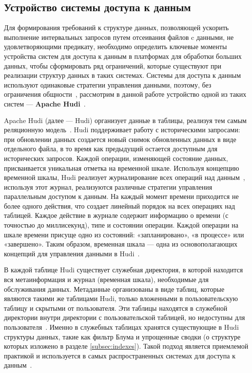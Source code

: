\subsection{Устройство системы доступа к данным}\label{subsec:systems_for_data_access}

Для формирования требований к структуре данных, позволяющей ускорить выполнение интервальных запросов путем отсеивания файлов c данными, не удовлетворяющими предикату, необходимо определить ключевые моменты устройства систем для доступа к данным в платформах для обработки больших данных, чтобы сформировать ряд ограничений, которые существуют при реализации структур данных в таких системах. Системы для доступа к данным используют одинаковые стратегии управления данными, поэтому, без ограничения общности~\cite{Analyzing_and_comparing_lakehouse_storage_systems}, рассмотрим в данной работе устройство одной из таких систем --- \textbf{Apache Hudi}~\cite{Analyzing_and_comparing_lakehouse_storage_systems}.

Apache Hudi (далее --- Hudi) организует данные в таблицы, реализуя тем самым реляционную модель~\cite{Database_systems_Garcia_Molina}. Hudi поддерживает работу с историческими запросами: при обновлении данных создается новый снимок обновленных данных в виде отдельного файла, в то время как предыдущий остается доступным для исторических запросов. Каждой операции, изменяющей состояние данных, присваивается уникальная отметка на временной шкале. Используя концепцию временной шкалы, Hudi реализует журналирование всех операций над данным~\cite{A_Logic_of_File_Systems}, используя этот журнал, реализуются различные стратегии управления параллельным доступом к данным. На каждый момент времени приходится не более одного действия, что создает линейный порядок на всех операциях над таблицей. Каждое действие в журнале содержит информацию о времени (с точностью до миллисекунд), типе и состоянии операции. Каждой операции на шкале времени присуще одно из состояний: «запланировано», «в процессе» или «завершено». Таким образом, временная шкала --- одна из основополагающих концепций для управления данными в Hudi~\cite{Hudi_Timeline}.

В каждой таблице Hudi существует служебная директория, в которой находится вся метаинформация и журнал (временная шкала), необходимые для обслуживания данных. Метаданные организованы в виде таблиц, которые  являются такими же таблицами Hudi, только вложенными в пользовательскую таблицу и скрытыми от пользователя. Эти таблицы находятся в служебной директории внутри директории с пользовательской таблицей, но недоступны для пользователя~\cite{Hudi_Metadata}. Именно в служебных таблицах хранятся существующие в Hudi структуры данных, такие как фильтр Блума и упрощенные сводки (о структуре которых изложено в разделе \ref{subsec:indexes}). Такой подход является приемлемой практикой и используется в самых распространенных системах для доступа к данным~\cite{Extensible_data_skipping}.


